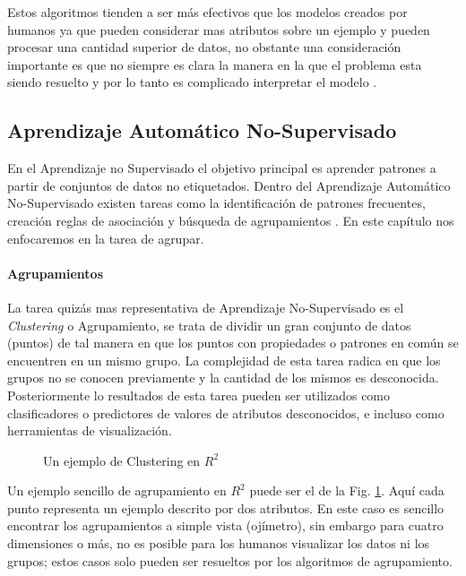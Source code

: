Estos algoritmos tienden a ser más efectivos que los modelos creados por humanos ya que pueden considerar mas atributos sobre un ejemplo y pueden procesar una cantidad superior de datos, no obstante una consideración importante es que no siempre es clara la manera en la que el problema esta siendo resuelto y por lo tanto es complicado interpretar el modelo \cite{rebala_introduction_2019}. 

\subsection{Aprendizaje Automático No-Supervisado}

En el Aprendizaje no Supervisado el objetivo principal es aprender patrones a partir de conjuntos de datos no etiquetados. Dentro del Aprendizaje Automático No-Supervisado existen tareas como la identificación de patrones frecuentes, creación reglas de asociación y búsqueda de agrupamientos \cite{kubat_introduction_2017}. En este capítulo nos enfocaremos en la tarea de agrupar.

\paragraph{Agrupamientos}

La tarea quizás mas representativa de Aprendizaje No-Supervisado es el \textit{Clustering} o Agrupamiento, se trata de dividir un gran conjunto de datos (puntos) de tal manera en que los puntos con propiedades o patrones en común se encuentren en un mismo grupo. La complejidad de esta tarea radica en que los grupos no se conocen previamente y la cantidad de los mismos es desconocida. Posteriormente lo resultados de esta tarea pueden ser utilizados como clasificadores o predictores de valores de atributos desconocidos, e incluso como herramientas de visualización. \cite{kubat_introduction_2017}

 \begin{figure}[htbp]
   \centering
   
    \caption{Un ejemplo de Clustering en $R^2$}
    \label{fig:clustering-example}
\end{figure}

Un ejemplo sencillo de agrupamiento en $R^2$ puede ser el de la Fig. \ref{fig:clustering-example}. Aquí cada punto representa un ejemplo descrito por dos atributos. En este caso es sencillo encontrar los agrupamientos a simple vista (ojímetro), sin embargo para cuatro dimensiones o más, no es posible para los humanos visualizar los datos ni los grupos; estos casos solo pueden ser resueltos por los algoritmos de agrupamiento. \cite{kubat_introduction_2017}

